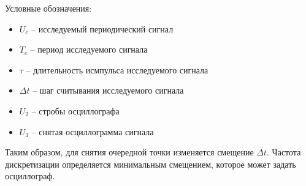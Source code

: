 Условные обозначения:
\begin{itemize}[label={}]
	\item $ U_{c} $ -- исследуемый периодический сигнал
	\item $ T_{c} $ -- период исследуемого сигнала
	\item $ \tau $ -- длительность исмпульса исследуемого сигнала
	\item $ \Delta t $ -- шаг считывания исследуемого сигнала
	\item $ U_{2} $ -- стробы осциллографа
	\item $ U_{3} $ -- снятая осциллограмма сигнала\\
\end{itemize}

Таким образом, для снятия очередной точки изменяется смещение $ \Delta t $.
Частота дискретизации определяется минимальным смещением, которое может задать осциллограф.
